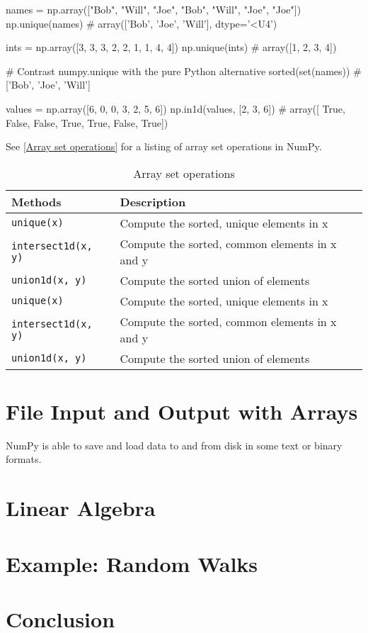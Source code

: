 \begin{pyc}
names = np.array(["Bob", "Will", "Joe", "Bob", "Will", "Joe", "Joe"])
np.unique(names)
# array(['Bob', 'Joe', 'Will'], dtype='<U4')

ints = np.array([3, 3, 3, 2, 2, 1, 1, 4, 4])
np.unique(ints)
# array([1, 2, 3, 4])

# Contrast numpy.unique with the pure Python alternative
sorted(set(names))
# ['Bob', 'Joe', 'Will']

values = np.array([6, 0, 0, 3, 2, 5, 6])
np.in1d(values, [2, 3, 6])
# array([ True, False, False,  True,  True, False,  True])
\end{pyc}

See \autoref{Array set operations} for a listing of array set operations in NumPy.

\begin{table}
    \caption{Array set operations}
    \label{Array set operations}
    \begin{tabularx}{\textwidth}{lX}
        \hline
        Methods                  & Description                                    \\
        \hline
        \verb|unique(x)|         & Compute the sorted, unique elements in x       \\
        \verb|intersect1d(x, y)| & Compute the sorted, common elements in x and y \\
        \verb|union1d(x, y)|     & Compute the sorted union of elements           \\
        \verb|unique(x)|         & Compute the sorted, unique elements in x       \\
        \verb|intersect1d(x, y)| & Compute the sorted, common elements in x and y \\
        \verb|union1d(x, y)|     & Compute the sorted union of elements           \\
        \hline
    \end{tabularx}
\end{table}
\section{File Input and Output with Arrays}
NumPy is able to save and load data to and from disk in some text or binary formats.
\section{Linear Algebra}
\section{Example: Random Walks}
\section{Conclusion}